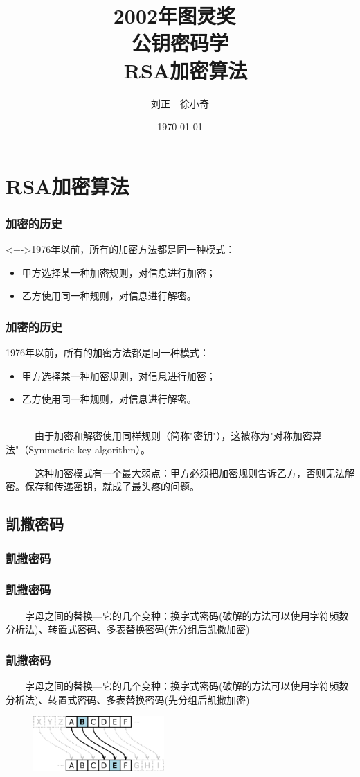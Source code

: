 \documentclass[slidestop,compress,mathserif]{beamer}
\title{2002年图灵奖~\\~公钥密码学~\\~RSA加密算法}
\author{刘正~~徐小奇}
\date{\today}
\begin{document}
\frame{\titlepage}

\section{RSA加密算法}

\begin{frame}
  \transdissolve
  \frametitle{加密的历史}
  
  \begin{block}<+->{1976年以前，所有的加密方法都是同一种模式：}
    \begin{itemize}[<+->]
        \item 甲方选择某一种加密规则，对信息进行加密；
        \item 乙方使用同一种规则，对信息进行解密。
    \end{itemize}
  \end{block}

\end{frame}

\begin{frame}
  \frametitle{加密的历史}
  
  \begin{block}{1976年以前，所有的加密方法都是同一种模式：}
    \begin{itemize}
        \item 甲方选择某一种加密规则，对信息进行加密；
        \item 乙方使用同一种规则，对信息进行解密。
    \end{itemize}
  \end{block}
  ~\\[0.6cm]

~ ~ ~ ~由于加密和解密使用同样规则（简称"密钥"），这被称为"对称加密算法"（Symmetric-key algorithm）。

~ ~ ~ ~这种加密模式有一个最大弱点：甲方必须把加密规则告诉乙方，否则无法解密。保存和传递密钥，就成了最头疼的问题。
\end{frame}

\subsection{\hfill 凯撒密码}
\begin{frame}
  \frametitle{凯撒密码}
\end{frame}
\begin{frame}
  \frametitle{凯撒密码}
  ~~~~字母之间的替换---它的几个变种：换字式密码(破解的方法可以使用字符频数分析法)、转置式密码、多表替换密码(先分组后凯撒加密)
\end{frame}
\begin{frame}
\transboxout
  \frametitle{凯撒密码}
  ~~~~字母之间的替换---它的几个变种：换字式密码(破解的方法可以使用字符频数分析法)、转置式密码、多表替换密码(先分组后凯撒加密)
  \begin{figure}
    \centering
    \includegraphics[width=5cm]{Caesar3.png}
  \end{figure}
\end{frame}
\end{document}
